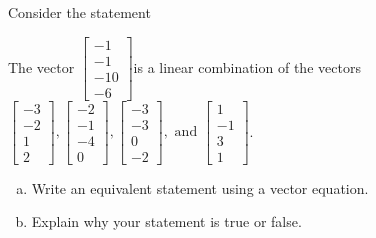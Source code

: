 
\begin{exerciseStatement}


Consider the statement 
\begin{center}\begin{minipage}{0.8\textwidth}
 The vector \( \left[\begin{array}{c}
-1 \\
-1 \\
-10 \\
-6
\end{array}\right] \)is a linear combination of the vectors \( \left[\begin{array}{c}
-3 \\
-2 \\
1 \\
2
\end{array}\right] , \left[\begin{array}{c}
-2 \\
-1 \\
-4 \\
0
\end{array}\right] , \left[\begin{array}{c}
-3 \\
-3 \\
0 \\
-2
\end{array}\right] , \text{ and } \left[\begin{array}{c}
1 \\
-1 \\
3 \\
1
\end{array}\right] \). 
\end{minipage}\end{center}
    


\begin{enumerate}[(a)]
\item  Write an equivalent statement using a vector equation.
\item  Explain why your statement is true or false.
\end{enumerate}
    
\end{exerciseStatement}
    
